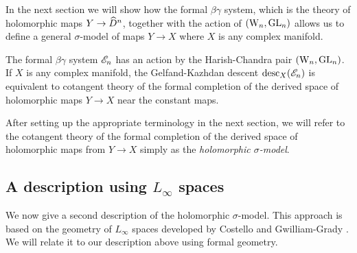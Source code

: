 
In the next section we will show how the formal $\beta\gamma$ system, which is the theory of holomorphic maps $Y \to \widehat{D}^n$, together with the action of $({{\rm W}_n}, {\rm GL}_n)$ allows us to define a general $\sigma$-model of maps $Y \to X$ where $X$ is any complex manifold.

\begin{prop}\label{prop: formal to global1}
The formal $\beta\gamma$ system $\mathscr E_n$ has an action by the Harish-Chandra pair $({{\rm W}_n}, {\rm GL}_n)$. 
If $X$ is any complex manifold, the Gelfand-Kazhdan descent ${\rm desc}_X(\mathscr E_n)$ is equivalent to cotangent theory of the formal completion of the derived space of holomorphic maps $Y \to X$ near the constant maps.
\end{prop}

\begin{rmk}
After setting up the appropriate terminology in the next section, we will refer to the cotangent theory of the formal completion of the derived space of holomorphic maps from $Y \to X$ simply as the {\em holomorphic $\sigma$-model}.
\end{rmk}

\subsection{A description using $L_\infty$ spaces}

We now give a second description of the holomorphic $\sigma$-model.
This approach is based on the geometry of $L_\infty$ spaces developed by Costello \cite{WG2} and Gwilliam-Grady \cite{GWCS, GWderived}.
We will relate it to our description above using formal geometry.

